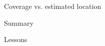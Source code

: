 \documentclass[aspectratio=169,12pt,t]{beamer}
\begin{document}
\begin{frame}[c]{Coverage vs. estimated location}


\note{
}
\end{frame}




\begin{frame}{Summary}

\note{
}
\end{frame}






\begin{frame}{Lessons}

\note{
}
\end{frame}
\end{document}
